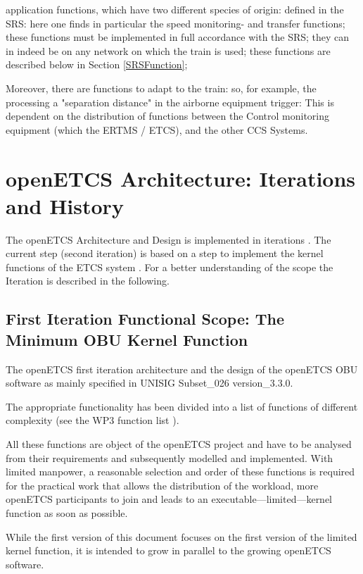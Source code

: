\documentclass{template/openetcs_report}
\begin{document}
application functions, which have two different species of origin: 
defined in the SRS: here one finds in particular the 
speed monitoring- and transfer functions; these functions 
must be implemented in full accordance with the SRS; they can in 
indeed be on any network on which the train is used; these functions 
are described below in Section \ref{SRSFunction}; 


Moreover, there are functions to adapt to the train: so, for example, the processing 
a "separation distance" in the airborne equipment trigger: 
This is dependent on the distribution of functions between the 
Control monitoring equipment (which the ERTMS / ETCS), and the other 
CCS Systems.

\section{openETCS Architecture: Iterations and History}

The openETCS Architecture and Design is implemented in iterations \cite{deployment}. The current step (second iteration) is based on a step to implement the kernel functions of the ETCS system \cite{firstIteration}. For a better understanding of the scope the Iteration is described in the following.

\subsection{First Iteration Functional Scope: The Minimum OBU Kernel Function}
\label{sec:FunctionalScopeTheMinimumOBUKernelFunction}

The openETCS first iteration architecture and the design of the openETCS OBU software as mainly specified in \cite{subset-026} UNISIG Subset\_026 version\_3.3.0. 

The appropriate functionality has been divided into a list of functions of different complexity (see the WP3 function list \cite{functions}).

All these functions are object of the openETCS project and have to be analysed from their requirements and subsequently modelled and implemented. With limited manpower, a reasonable selection and order of these functions is required for the practical work that allows the distribution of the workload, more openETCS participants to join and leads to an executable---limited---kernel function as soon as possible. 

While the first version of this document focuses on the first version of the limited kernel function, it is intended to grow in parallel to the growing openETCS software.
\end{document}
